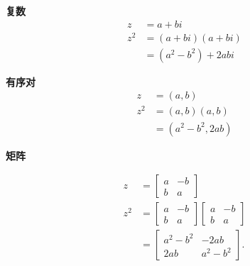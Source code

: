 \begin{tcolorbox}[breakable, enhanced, title = {平方}]
  \textbf{复数}
  $$
    \begin{aligned}
      z     & =a+b i                            \\
      z^{2} & =(a+b i)(a+b i)                   \\
            & =\left(a^{2}-b^{2}\right)+2 a b i
    \end{aligned}
  $$

  \textbf{有序对}
  $$
    \begin{aligned}
      z     & =(a, b)                          \\
      z^{2} & =(a, b)(a, b)                    \\
            & =\left(a^{2}-b^{2}, 2 a b\right)
    \end{aligned}
  $$

  \textbf{矩阵}

  $$
    \begin{aligned}
      z     & =\left[\begin{array}{cc}
          a & -b \\
          b & a
        \end{array}\right]                                         \\
      z^{2} & =\left[\begin{array}{cc}
          a & -b \\
          b & a
        \end{array}\right]\left[\begin{array}{cc}
          a & -b \\
          b & a
        \end{array}\right] \\
            & =\left[\begin{array}{cc}
          a^{2}-b^{2} & -2 a b      \\
          2 a b       & a^{2}-b^{2}
        \end{array}\right] .
    \end{aligned}
  $$
\end{tcolorbox}

